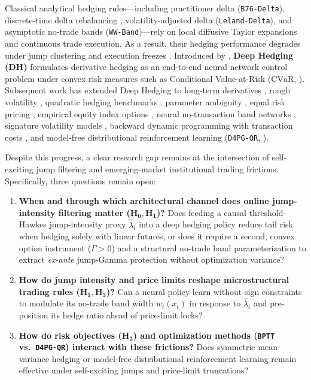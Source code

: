 \documentclass[11pt,a4paper]{article}
\begin{document}
Classical analytical hedging rules---including \citet{Black1976} practitioner delta (\texttt{B76-Delta}), discrete-time delta rebalancing \citep{BoyleEmanuel1980,Bakshi1997}, \citet{Leland1985} volatility-adjusted delta (\texttt{Leland-Delta}), and \citet{Whalley1997} asymptotic no-trade bands (\texttt{WW-Band})---rely on local diffusive Taylor expansions and continuous trade execution. As a result, their hedging performance degrades under jump clustering and execution freezes \citep{Merton1976,Jouini2026,Shakeel2026}. Introduced by \citet{Buehler2019}, \textbf{Deep Hedging (DH)} formulates derivative hedging as an end-to-end neural network control problem under convex risk measures such as Conditional Value-at-Risk ($\text{CVaR}$, \citealt{Rockafellar2000}). Subsequent work has extended Deep Hedging to long-term derivatives \citep{Carbonneau2021}, rough volatility \citep{Horvath2021}, quadratic hedging benchmarks \citep{Dai2022}, parameter ambiguity \citep{Luetkebohmert2022}, equal risk pricing \citep{Marzban2022,CarbonneauGodin2024}, empirical equity index options \citep{Mikkila2023,Francois2025}, neural no-transaction band networks \citep{Imaki2023}, signature volatility models \citep{AbiJaber2025}, backward dynamic programming with transaction costs \citep{Goudenege2023,Brugiere2026}, and model-free distributional reinforcement learning (\texttt{D4PG-QR}, \citealt{Cao2023,Pickard2023}).

Despite this progress, a clear research gap remains at the intersection of self-exciting jump filtering and emerging-market institutional trading frictions. Specifically, three questions remain open:
\begin{enumerate}
  \item \textbf{When and through which architectural channel does online jump-intensity filtering matter ($\mathbf{H_0, H_1}$)?} Does feeding a causal threshold-Hawkes jump-intensity proxy $\hat{\lambda}_t$ into a deep hedging policy reduce tail risk when hedging solely with linear futures, or does it require a second, convex option instrument ($\Gamma > 0$) and a structural no-trade band parameterization to extract \emph{ex-ante} jump-Gamma protection without optimization variance?
  \item \textbf{How do jump intensity and price limits reshape microstructural trading rules ($\mathbf{H_1, H_3}$)?} Can a neural policy learn without sign constraints to modulate its no-trade band width $w_t(x_t)$ in response to $\hat{\lambda}_t$ and pre-position its hedge ratio ahead of price-limit locks?
  \item \textbf{How do risk objectives ($\mathbf{H_2}$) and optimization methods (\texttt{BPTT} vs.\ \texttt{D4PG-QR}) interact with these frictions?} Does symmetric mean-variance hedging or model-free distributional reinforcement learning remain effective under self-exciting jumps and price-limit truncations?
\end{enumerate}
\end{document}
